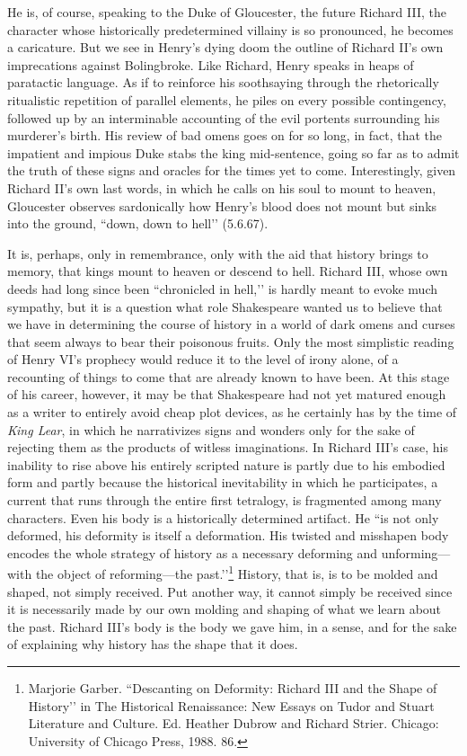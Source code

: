 He is, of course, speaking to the Duke of Gloucester, the future Richard III, the character whose historically predetermined villainy is so pronounced, he becomes a caricature.
But we see in Henry’s dying doom the outline of Richard II’s own imprecations against Bolingbroke.
Like Richard, Henry speaks in heaps of paratactic language.
As if to reinforce his soothsaying through the rhetorically ritualistic repetition of parallel elements, he piles on every possible contingency, followed up by an interminable accounting of the evil portents surrounding his murderer’s birth.
His review of bad omens goes on for so long, in fact, that the impatient and impious Duke stabs the king mid-sentence, going so far as to admit the truth of these signs and oracles for the times yet to come.
Interestingly, given Richard II’s own last words, in which he calls on his soul to mount to heaven, Gloucester observes sardonically how Henry’s blood does not mount but sinks into the ground, ``down, down to hell’’ (5.6.67).

It is, perhaps, only in remembrance, only with the aid that history brings to memory, that kings mount to heaven or descend to hell.
Richard III, whose own deeds had long since been ``chronicled in hell,’’ is hardly meant to evoke much sympathy, but it is a question what role Shakespeare wanted us to believe that we have in determining the course of history in a world of dark omens and curses that seem always to bear their poisonous fruits.
Only the most simplistic reading of Henry VI’s prophecy would reduce it to the level of irony alone, of a recounting of things to come that are already known to have been.
At this stage of his career, however, it may be that Shakespeare had not yet matured enough as a writer to entirely avoid cheap plot devices, as he certainly has by the time of \emph{King Lear}, in which he narrativizes signs and wonders only for the sake of rejecting them as the products of witless imaginations.
In Richard III’s case, his inability to rise above his entirely scripted nature is partly due to his embodied form and partly because the historical inevitability in which he participates, a current that runs through the entire first tetralogy, is fragmented among many characters.
Even his body is a historically determined artifact.
He ``is not only deformed, his deformity is itself a deformation.
His twisted and misshapen body encodes the whole strategy of history as a necessary deforming and unforming---with the object of reforming---the past.’’\footnote{Marjorie Garber. ``Descanting on Deformity: Richard III and the Shape of History’’ in The Historical Renaissance: New Essays on Tudor and Stuart Literature and Culture. Ed. Heather Dubrow and Richard Strier. Chicago: University of Chicago Press, 1988. 86.} History, that is, is to be molded and shaped, not simply received.
Put another way, it cannot simply be received since it is necessarily made by our own molding and shaping of what we learn about the past.
Richard III’s body is the body we gave him, in a sense, and for the sake of explaining why history has the shape that it does.

